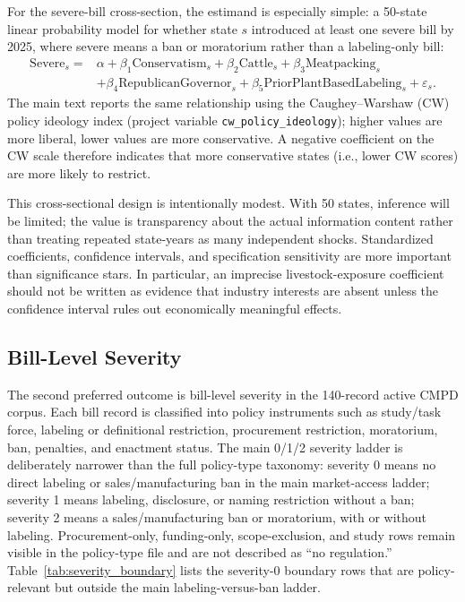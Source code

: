 \documentclass[12pt]{article}
\begin{document}
For the severe-bill cross-section, the estimand is especially simple: a 50-state linear probability model for whether state $s$ introduced at least one severe bill by 2025, where severe means a ban or moratorium rather than a labeling-only bill:
\begin{equation}
\begin{aligned}
\mathrm{Severe}_s
= {} & \alpha
+ \beta_1 \mathrm{Conservatism}_s
+ \beta_2 \mathrm{Cattle}_s
+ \beta_3 \mathrm{Meatpacking}_s \\
&+ \beta_4 \mathrm{RepublicanGovernor}_s
+ \beta_5 \mathrm{PriorPlantBasedLabeling}_s
+ \varepsilon_s .
\end{aligned}
\label{eq:severe_lpm}
\end{equation}
The main text reports the same relationship using the Caughey--Warshaw (CW) policy ideology index (project variable \texttt{cw\_policy\_ideology}); higher values are more liberal, lower values are more conservative.  A negative coefficient on the CW scale therefore indicates that more conservative states (i.e., lower CW scores) are more likely to restrict.

This cross-sectional design is intentionally modest.  With 50 states, inference will be limited; the value is transparency about the actual information content rather than treating repeated state-years as many independent shocks.  Standardized coefficients, confidence intervals, and specification sensitivity are more important than significance stars.  In particular, an imprecise livestock-exposure coefficient should not be written as evidence that industry interests are absent unless the confidence interval rules out economically meaningful effects.

\subsection{Bill-Level Severity}

The second preferred outcome is bill-level severity in the 140-record active CMPD corpus.  Each bill record is classified into policy instruments such as study/task force, labeling or definitional restriction, procurement restriction, moratorium, ban, penalties, and enactment status.  The main 0/1/2 severity ladder is deliberately narrower than the full policy-type taxonomy: severity 0 means no direct labeling or sales/manufacturing ban in the main market-access ladder; severity 1 means labeling, disclosure, or naming restriction without a ban; severity 2 means a sales/manufacturing ban or moratorium, with or without labeling.  Procurement-only, funding-only, scope-exclusion, and study rows remain visible in the policy-type file and are not described as ``no regulation.''  Table~\ref{tab:severity_boundary} lists the severity-0 boundary rows that are policy-relevant but outside the main labeling-versus-ban ladder.
\end{document}
